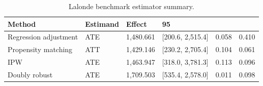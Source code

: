 \begin{table}[t!]
\centering
\footnotesize
\caption{Lalonde benchmark estimator summary.}
\label{tab:paper-lalonde_public_benchmark-estimators}
\setlength{\tabcolsep}{4.5pt}
\begin{tabular}{llllll}
\hline
Method & Estimand & Effect & 95\\%
\hline
Regression adjustment & ATE & 1,480.661 & [200.6, 2,515.4] & 0.058 & 0.410 \\
Propensity matching & ATT & 1,429.146 & [230.2, 2,705.4] & 0.104 & 0.061 \\
IPW & ATE & 1,463.947 & [318.0, 3,781.3] & 0.113 & 0.096 \\
Doubly robust & ATE & 1,709.503 & [535.4, 2,578.0] & 0.011 & 0.098 \\
\hline
\end{tabular}
\end{table}
